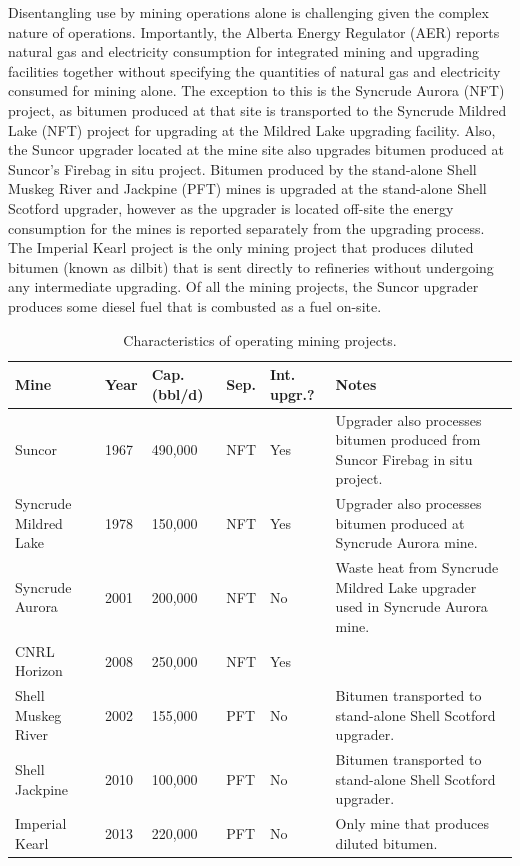 \documentclass[11pt]{report}
\begin{document}
Disentangling use by mining operations alone is challenging given the complex nature of operations. Importantly, the Alberta Energy Regulator (AER) reports natural gas and electricity consumption for integrated mining and upgrading facilities together without specifying the quantities of natural gas and electricity consumed for mining alone. The exception to this is the Syncrude Aurora (NFT) project, as bitumen produced at that site is transported to the Syncrude Mildred Lake (NFT) project for upgrading at the Mildred Lake upgrading facility.  Also, the Suncor upgrader located at the mine site also upgrades bitumen produced at Suncor's Firebag in situ project.  Bitumen produced by the stand-alone Shell Muskeg River and Jackpine (PFT) mines is upgraded at the stand-alone Shell Scotford upgrader, however as the upgrader is located off-site the energy consumption for the mines is reported separately from the upgrading process. The Imperial Kearl project is the only mining project that produces diluted bitumen (known as dilbit) that is sent directly to refineries without undergoing any intermediate upgrading.  Of all the mining projects, the Suncor upgrader produces some diesel fuel that is combusted as a fuel on-site.

\begin{table}
\caption{Characteristics of operating mining projects.}
\label{tab:bitumen_mining_data}
\begin{scriptsize}
\begin{tabularx}{1\columnwidth}{p{}p{}p{}p{}p{}p{}}
\toprule
Mine						& Year & Cap. (bbl/d) & Sep. & Int. upgr.? & Notes \\
\midrule
Suncor					& 1967	& 490,000		& NFT	& Yes	&Upgrader also processes bitumen produced from Suncor Firebag in situ project. \\
Syncrude Mildred Lake		& 1978	& 150,000		& NFT	&Yes		& Upgrader also processes bitumen produced at Syncrude Aurora mine. \\
Syncrude Aurora			& 2001	& 200,000		& NFT	& No		& Waste heat from Syncrude Mildred Lake upgrader used in Syncrude Aurora mine. \\
CNRL Horizon				& 2008	& 250,000		& NFT	& Yes	& \\				
Shell Muskeg River			&2002	& 155,000		& PFT	& No		& Bitumen transported to stand-alone Shell Scotford upgrader. \\
Shell Jackpine				& 2010	& 100,000		& PFT	& No		& Bitumen transported to stand-alone Shell Scotford upgrader. \\
Imperial Kearl				& 2013	& 220,000		& PFT	& No		& Only mine that produces diluted bitumen. \\
\bottomrule
\end{tabularx}
\end{scriptsize}
\end{table}
\end{document}
